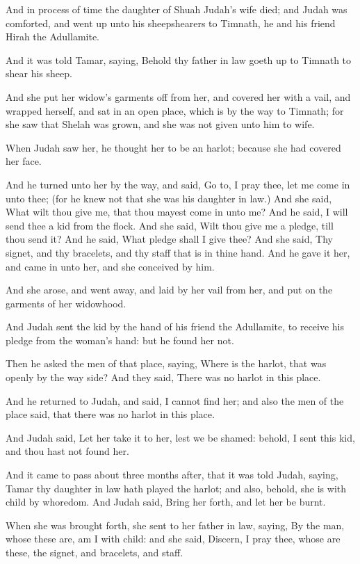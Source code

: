 \verse And in process of time the daughter of Shuah Judah's wife died; and Judah was comforted, and went up unto his sheepshearers to Timnath, he and his friend Hirah the Adullamite.

\verse And it was told Tamar, saying, Behold thy father in law goeth up to Timnath to shear his sheep.

\verse And she put her widow's garments off from her, and covered her with a vail, and wrapped herself, and sat in an open place, which is by the way to Timnath; for she saw that Shelah was grown, and she was not given unto him to wife.

\verse When Judah saw her, he thought her to be an harlot; because she had covered her face.

\verse And he turned unto her by the way, and said, Go to, I pray thee, let me come in unto thee; (for he knew not that she was his daughter in law.) And she said, What wilt thou give me, that thou mayest come in unto me?  \verse And he said, I will send thee a kid from the flock.  And she said, Wilt thou give me a pledge, till thou send it?  \verse And he said, What pledge shall I give thee? And she said, Thy signet, and thy bracelets, and thy staff that is in thine hand. And he gave it her, and came in unto her, and she conceived by him.

\verse And she arose, and went away, and laid by her vail from her, and put on the garments of her widowhood.

\verse And Judah sent the kid by the hand of his friend the Adullamite, to receive his pledge from the woman's hand: but he found her not.

\verse Then he asked the men of that place, saying, Where is the harlot, that was openly by the way side? And they said, There was no harlot in this place.

\verse And he returned to Judah, and said, I cannot find her; and also the men of the place said, that there was no harlot in this place.

\verse And Judah said, Let her take it to her, lest we be shamed: behold, I sent this kid, and thou hast not found her.

\verse And it came to pass about three months after, that it was told Judah, saying, Tamar thy daughter in law hath played the harlot; and also, behold, she is with child by whoredom. And Judah said, Bring her forth, and let her be burnt.

\verse When she was brought forth, she sent to her father in law, saying, By the man, whose these are, am I with child: and she said, Discern, I pray thee, whose are these, the signet, and bracelets, and staff.

